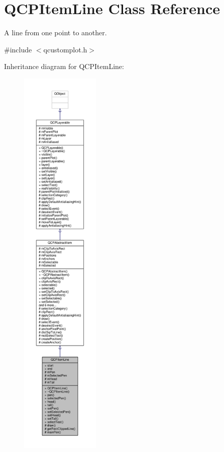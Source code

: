 \hypertarget{class_q_c_p_item_line}{}\section{Q\+C\+P\+Item\+Line Class Reference}
\label{class_q_c_p_item_line}


A line from one point to another.  




{\ttfamily \#include $<$qcustomplot.\+h$>$}



Inheritance diagram for Q\+C\+P\+Item\+Line\+:\nopagebreak
\begin{figure}[H]
\begin{center}
\leavevmode
\includegraphics[height=550pt]{class_q_c_p_item_line__inherit__graph}
\end{center}
\end{figure}


